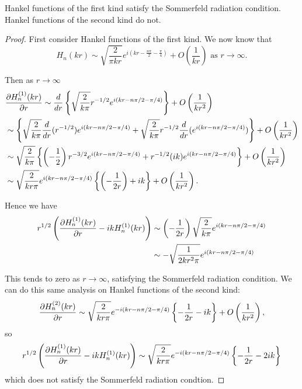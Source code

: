 \begin{propn}
  Hankel functions of the first kind satisfy the Sommerfeld radiation condition. Hankel functions of the second kind do not.
\end{propn}
\begin{proof}
  First consider Hankel functions of the first kind. We now know that
  \begin{equation}
    H_n(kr) \sim \sqrt{\frac{2}{\pi kr}} e^{i(kr - \frac{n\pi}{2} - \frac{\pi}{4})} + O\left(\frac{1}{kr}\right) \text{ as } r \rightarrow \infty.
  \end{equation}

  Then as $r\rightarrow\infty$
  \begin{align*}
    &\frac{\partial H^{(1)}_n(kr)}{\partial r}
    \sim \frac{d}{dr} \left\{
    \sqrt{\frac{2}{k\pi}} r^{-1/2} e^{i(kr - n\pi/2- \pi/4)}
    \right\} + O\left(\frac{1}{kr^2}\right)\\
    &\sim\left\{
    \sqrt{\frac{2}{k\pi}} \frac{d}{dr} (r^{-1/2}) e^{i(kr - n\pi/2- \pi/4)}
    + \sqrt{\frac{2}{k\pi}} r^{-1/2} \frac{d}{dr}(e^{i(kr - n\pi/2- \pi/4)})
    \right\} + O\left(\frac{1}{kr^2}\right)\\
    &\sim \sqrt{\frac{2}{k\pi}} \left\{
    \left(-\frac{1}{2} \right) r^{-3/2} e^{i(kr - n\pi/2- \pi/4)} + r^{-1/2} (ik) e^{i(kr - n\pi/2- \pi/4)}
    \right\} + O\left(\frac{1}{kr^2}\right)\\
    &\sim \sqrt{\frac{2}{kr\pi}} e^{i(kr - n\pi/2- \pi/4)} \left\{
    \left(-\frac{1}{2r} \right) + ik
    \right\}  + O\left(\frac{1}{kr^2}\right).
  \end{align*}

  Hence we have
  \begin{align*}
    r^{1/2} \left(
      \frac{\partial H^{(1)}_n(kr)}{\partial r} - ik H^{(1)}_n(kr)
    \right)
    & \sim \left(-\frac{1}{2r} \right)
      \sqrt{\frac{2}{k\pi}} e^{i(kr - n\pi/2- \pi/4)} \\
    & \sim -\sqrt{\frac{1}{2kr^2\pi}} e^{i(kr - n\pi/2- \pi/4)}\\
  \end{align*}

  This tends to zero as $r\rightarrow\infty$, satisfying the Sommerfeld radiation condition. We can do this same analysis on Hankel functions of the second kind:
  \begin{gather*}
    \frac{\partial H^{(2)}_n(kr)}{\partial r} \sim \sqrt{\frac{2}{kr\pi}} e^{-i(kr - n\pi/2- \pi/4)} \left\{
    -\frac{1}{2r} - ik
    \right\} + O\left(\frac{1}{kr^2}\right), \\
  \end{gather*}
  so
  \begin{gather*}
    r^{1/2} \left(
      \frac{\partial H^{(1)}_n(kr)}{\partial r} - ik H^{(1)}_n(kr)
    \right)
    \sim \sqrt{\frac{2}{kr\pi}} e^{-i(kr - n\pi/2- \pi/4)} \left\{
    -\frac{1}{2r} - 2ik
    \right\}
  \end{gather*}
  which does not satisfy the Sommerfeld radiation condtion.
\end{proof}

